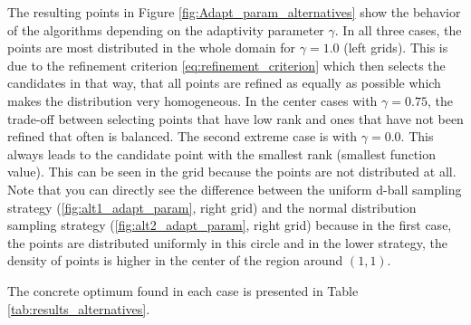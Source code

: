 The resulting points in Figure \ref{fig:Adapt_param_alternatives} show the behavior of the algorithms depending on the adaptivity parameter $ \gamma $. In all three cases, the points are most distributed in the whole domain for $ \gamma = 1.0 $ (left grids). This is due to the refinement criterion \ref{eq:refinement_criterion} which then selects the candidates in that way, that all points are refined as equally as possible which makes the distribution very homogeneous. In the center cases with $ \gamma = 0.75 $, the trade-off between selecting points that have low rank and ones that have not been refined that often is balanced. The second extreme case is with $ \gamma = 0.0 $. This always leads to the candidate point with the smallest rank (smallest function value). This can be seen in the grid because the points are not distributed at all. Note that you can directly see the difference between the uniform d-ball sampling strategy (\ref{fig:alt1_adapt_param}, right grid) and the normal distribution sampling strategy (\ref{fig:alt2_adapt_param}, right grid) because in the first case, the points are distributed uniformly in this circle and in the lower strategy, the density of points is higher in the center of the region around $ (1,1) $. \newline 

The concrete optimum found in each case is presented in Table \ref{tab:results_alternatives}.

